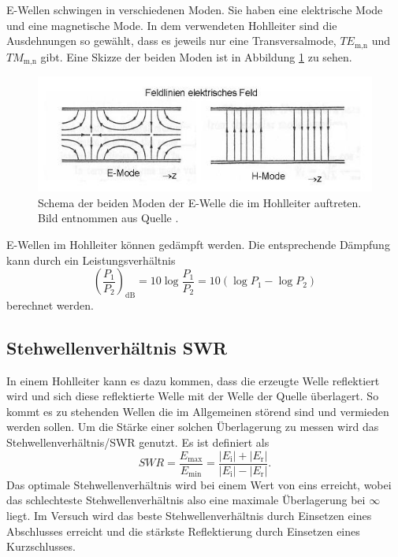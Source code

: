 E-Wellen schwingen in verschiedenen Moden.
Sie haben eine elektrische Mode und eine magnetische Mode.
In dem verwendeten Hohlleiter sind die Ausdehnungen so gewählt, dass es jeweils nur eine Transversalmode, $TE_\text{m,n}$ und $TM_\text{m,n}$ gibt.
Eine Skizze der beiden Moden ist in Abbildung \ref{fig:Moden_Hohleiter} zu sehen.
\begin{figure}
    \centering
    \includegraphics[width=\textwidth]{content/data/Moden_Hohleiter.JPG}
    \caption{Schema der beiden Moden der E-Welle die im Hohlleiter auftreten. Bild entnommen aus Quelle \cite{wikipedia}.}
    \label{fig:Moden_Hohleiter}
\end{figure}
E-Wellen im Hohlleiter können gedämpft werden. Die entsprechende Dämpfung kann durch ein Leistungsverhältnis
\begin{equation}
    \left (\frac{P_1}{P_2} \right )_\text{dB} = 10 \log \frac{P_1}{P_2} = 10 \left ( \log P_1 - \log P_2 \right )
\end{equation}
berechnet werden.
\FloatBarrier

\subsection{Stehwellenverhältnis SWR}
\label{sec:swr}
In einem Hohlleiter kann es dazu kommen, dass die erzeugte Welle reflektiert wird und sich diese reflektierte Welle mit der Welle der Quelle überlagert.
So kommt es zu stehenden Wellen die im Allgemeinen störend sind und vermieden werden sollen.
Um die Stärke einer solchen Überlagerung zu messen wird das Stehwellenverhältnis/SWR genutzt.
Es ist definiert als 
\begin{equation}
    SWR = \frac{E _\text{max}}{E _\text{min}} = \frac{\left | E _\text{i} \right | + \left | E _\text{r} \right |}{\left | E _\text{i} \right | - \left | E _\text{r} \right |}.
\end{equation}
Das optimale Stehwellenverhältnis wird bei einem Wert von eins erreicht, wobei das schlechteste Stehwellenverhältnis also eine maximale Überlagerung bei $ \infty $ liegt.
Im Versuch wird das beste Stehwellenverhältnis durch Einsetzen eines Abschlusses erreicht und die stärkste Reflektierung durch Einsetzen eines Kurzschlusses.

